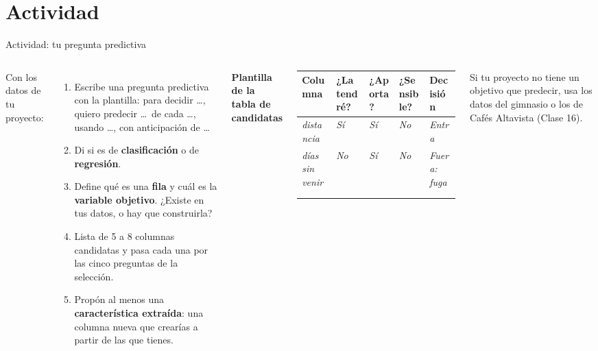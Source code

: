 \documentclass[aspectratio=169,11pt]{beamer}
\begin{document}
\section{Actividad}
\begin{frame}[t]{Actividad: tu pregunta predictiva}
  \begin{columns}[T,onlytextwidth]
    \small Con los datos de tu proyecto:
    \begin{enumerate}
      \footnotesize
      \item Escribe una pregunta predictiva con la plantilla: para decidir
        \ldots, quiero predecir \ldots\ de cada \ldots, usando \ldots, con
        anticipación de \ldots
      \item Di si es de \textbf{clasificación} o de \textbf{regresión}.
      \item Define qué es una \textbf{fila} y cuál es la \textbf{variable
        objetivo}. ¿Existe en tus datos, o hay que construirla?
      \item Lista de 5 a 8 columnas candidatas y pasa cada una por las
        cinco preguntas de la selección.
      \item Propón al menos una \textbf{característica extraída}: una
        columna nueva que crearías a partir de las que tienes.
    \end{enumerate}
    \footnotesize\textbf{Plantilla de la tabla de candidatas}
    \vspace{0.05cm}

    \scriptsize
    \renewcommand{\arraystretch}{1.3}
    \setlength{\tabcolsep}{2pt}
    \begin{tabular}{@{}L{1.15cm}C{0.95cm}C{1.1cm}C{1.3cm}L{1.2cm}@{}}
      \toprule
      \textbf{Columna} & \textbf{¿La tendré?} & \textbf{¿Aporta?} & \textbf{¿Sensible?} & \textbf{Decisión} \\
      \midrule
      \textit{distancia} & \textit{Sí} & \textit{Sí} & \textit{No} & \textit{Entra} \\
      \textit{días sin venir} & \textit{No} & \textit{Sí} & \textit{No} & \textit{Fuera: fuga} \\
      & & & & \\
      & & & & \\
      \bottomrule
    \end{tabular}
    \vspace{0.1cm}

    \scriptsize Si tu proyecto no tiene un objetivo que predecir, usa los
    datos del gimnasio o los de Cafés Altavista (Clase 16).
  \end{columns}
\end{frame}
\end{document}
